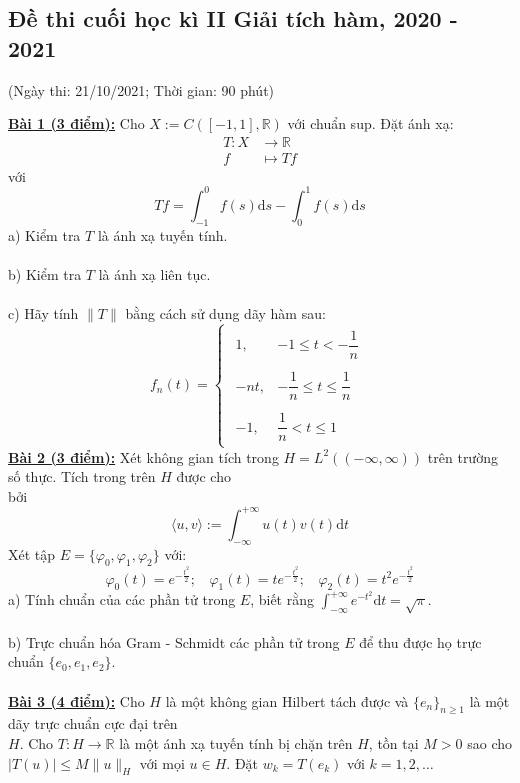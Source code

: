 \documentclass[10pt, a4paper]{article}
\begin{document}
\subsection{Đề thi cuối học kì II Giải tích hàm, 2020 - 2021}
\begin{center}
	\color{blue}(Ngày thi: 21/10/2021; Thời gian: 90 phút)
\end{center}
\color{red}\underline{\textbf{Bài 1 (3 điểm):}} \color{black}Cho $X:=C([-1,1],\mathbb R)$ với chuẩn sup. Đặt ánh xạ: \begin{align*}
	T:X&\rightarrow\mathbb R\\
	f&\mapsto Tf
\end{align*} với $$Tf=\displaystyle\int_{-1}^0f(s)\text{d}s-\displaystyle\int_0^1f(s)\text{d}s$$
\color{red}a) \color{black}Kiểm tra $T$ là ánh xạ tuyến tính.\\\\
\color{red}b) \color{black}Kiểm tra $T$ là ánh xạ liên tục.\\\\
\color{red}c) \color{black}Hãy tính $\lVert T\rVert$ bằng cách sử dụng dãy hàm sau: $$f_n(t)=\begin{cases}
\begin{array}{ll}
	1, & -1\le t<-\dfrac1n\\\\
	-nt, & -\dfrac1n\le t\le\dfrac1n\\\\
	-1, & \dfrac1n<t\le 1
\end{array}
\end{cases}$$
\color{red}\underline{\textbf{Bài 2 (3 điểm):}} \color{black}Xét không gian tích trong $H=L^2((-\infty,\infty))$ trên trường số thực. Tích trong trên $H$ được cho\\ bởi $$\langle u,v\rangle:=\displaystyle\int_{-\infty}^{+\infty} u(t)v(t)\text{d}t$$ Xét tập $E=\{\varphi_0,\varphi_1,\varphi_2\}$ với: $$\varphi_0(t)=e^{-\frac{t^2}{2}};~~~~\varphi_1(t)=te^{-\frac{t^2}{2}};~~~~\varphi_2(t)=t^2e^{-\frac{t^2}{2}}$$
\color{red}a) \color{black}Tính chuẩn của các phần tử trong $E$, biết rằng $\displaystyle\int_{-\infty}^{+\infty} e^{-t^2}\text{d}t=\sqrt\pi$.\\\\
\color{red}b) \color{black}Trực chuẩn hóa Gram - Schmidt các phần tử trong $E$ để thu được họ trực chuẩn $\{e_0,e_1,e_2\}$.\\\\
\color{red}\underline{\textbf{Bài 3 (4 điểm):}} \color{black}Cho $H$ là một không gian Hilbert tách được và $\{e_n\}_{n\ge1}$ là một dãy trực chuẩn cực đại trên\\ $H$. Cho $T:H\rightarrow\mathbb R$ là một ánh xạ tuyến tính bị chặn trên $H$, tồn tại $M>0$ sao cho $|T(u)|\le M\lVert u\rVert_H$ với mọi $u\in H$. Đặt $w_k=T(e_k)$ với $k=1,2,\dots$\\\\
\end{document}
